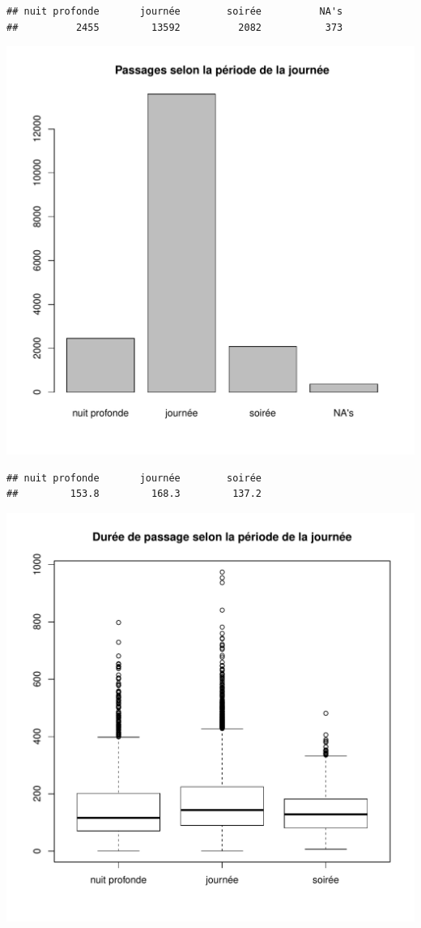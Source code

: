 \documentclass[12pt,english,french,twoside]{report}\usepackage[]{graphicx}\usepackage[]{color}
\makeatletter
\def\maxwidth{ %
  \ifdim\Gin@nat@width>\linewidth
    \linewidth
  \else
    \Gin@nat@width
  \fi
}
\newenvironment{kframe}{%
 \def\at@end@of@kframe{}%
 \ifinner\ifhmode%
  \def\at@end@of@kframe{\end{minipage}}%
  \begin{minipage}{\columnwidth}%
 \fi\fi%
 \def\FrameCommand##1{\hskip\@totalleftmargin \hskip-\fboxsep
 \colorbox{shadecolor}{##1}\hskip-\fboxsep
     \hskip-\linewidth \hskip-\@totalleftmargin \hskip\columnwidth}%
 \MakeFramed {\advance\hsize-\width
   \@totalleftmargin\z@ \linewidth\hsize
   \@setminipage}}%
 {\par\unskip\endMakeFramed%
 \at@end@of@kframe}
\newenvironment{knitrout}{}{} %
\makeatother
\begin{document}
\begin{knitrout}
\color{fgcolor}\begin{kframe}
\begin{verbatim}
## nuit profonde       journée        soirée          NA's 
##          2455         13592          2082           373
\end{verbatim}
\end{kframe}
\includegraphics[width=\maxwidth]{figure/duree_heure1} 
\begin{kframe}\begin{verbatim}
## nuit profonde       journée        soirée 
##         153.8         168.3         137.2
\end{verbatim}
\end{kframe}
\includegraphics[width=\maxwidth]{figure/duree_heure2} 


\end{knitrout}
\end{document}
